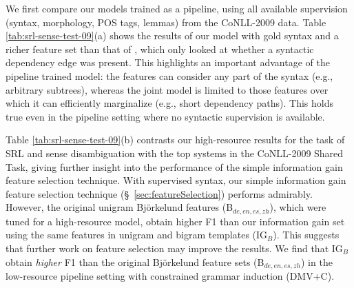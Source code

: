 \documentclass[11pt]{article}
\newcommand{\bjorkIgFeats}{\textrm{IG$_{B}$}}
\newcommand{\bjorkLsFeats}{\textrm{B$_{de,en,es,zh}$}}
\begin{document}
We first compare our models trained as a pipeline, using
all available supervision (syntax, morphology, POS tags, lemmas) from
the CoNLL-2009 data. 
Table \ref{tab:srl-sense-test-09}(a)
shows the results of our model with
gold syntax and a richer feature set than that of
, which only looked at whether a
syntactic dependency edge was present. This highlights an important
advantage of the pipeline trained model: the features can consider any
part of the syntax (e.g., arbitrary subtrees), whereas
the joint model is limited to those features over which it can
efficiently marginalize (e.g., short dependency paths). This holds true
even in the pipeline setting where no syntactic supervision is available. 

Table \ref{tab:srl-sense-test-09}(b) contrasts our
high-resource results for the task of SRL and sense disambiguation with
the top systems in the CoNLL-2009 Shared Task, giving
further insight into the performance of the simple information gain
feature selection technique.
With supervised syntax, our simple information gain feature selection technique
  (\S~\ref{sec:featureSelection}) performs admirably. However, the 
  original unigram 
  Bj\"orkelund features (\bjorkLsFeats{}), which were tuned for
  a high-resource model, obtain higher F1 than our information gain set
  using the same features in unigram and bigram templates 
  (\bjorkIgFeats{}).  
  This suggests that further 
  work on feature selection may improve the results. 
  We find that \bjorkIgFeats{} obtain \emph{higher} F1 than the original  Bj\"orkelund feature sets 
  (\bjorkLsFeats{}) in
  the low-resource pipeline setting with constrained grammar induction (DMV+C).
\end{document}
